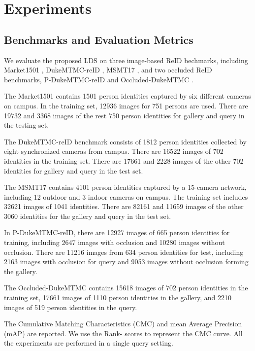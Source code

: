 \documentclass[a4paper]{cas-dc}
\begin{document}
\section{Experiments} \label{Experiments}

\subsection{Benchmarks and Evaluation Metrics}
We evaluate the proposed LDS on three image-based ReID bechmarks, including Market1501 \cite{RN149}, DukeMTMC-reID \cite{RN189}, MSMT17 \cite{RN172}, and two occluded ReID benchmarks, P-DukeMTMC-reID \cite{RN475} and Occluded-DukeMTMC \cite{RN291}. 

The Market1501 contains 1501 person identities captured by six different cameras on campus. In the training set, 12936 images for 751 persons are used. There are 19732 and 3368 images of the rest 750 person identities for gallery and query in the testing set.

The DukeMTMC-reID benchmark consists of 1812 person identities collected by eight synchronized cameras from campus. There are 16522 images of 702 identities in the training set. There are 17661 and 2228 images of the other 702 identities for gallery and query in the test set.

The MSMT17 contains 4101 person identities captured by a 15-camera network, including 12 outdoor and 3 indoor cameras on campus. The training set includes 32621 images of 1041 identities. There are 82161 and 11659 images of the other 3060 identities for the gallery and query in the test set.

In P-DukeMTMC-reID, there are 12927 images of 665 person identities for training, including 2647 images with occlusion and 10280 images without occlusion. There are 11216 images from 634 person identities for test, including 2163 images with occlusion for query and 9053 images without occlusion forming the gallery.

The Occluded-DukeMTMC contains 15618 images of 702 person identities in the training set, 17661 images of 1110 person identities in the gallery, and 2210 images of 519 person identities in the query.

The Cumulative Matching Characteristics (CMC) \cite{RN168} and mean Average Precision (mAP) \cite{RN149} are reported. We use the Rank- scores to represent the CMC curve. All the experiments are performed in a single query setting.
\end{document}
